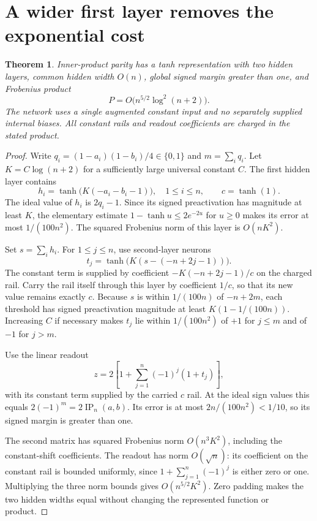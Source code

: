 \documentclass[11pt]{article}
\newtheorem{theorem}{Theorem}[section]
\theoremstyle{remark}\newtheorem{remark}[theorem]{Remark}
\newcommand{\IP}{\operatorname{IP}}
\begin{document}
\section{A wider first layer removes the exponential cost}
\begin{theorem}\label{thm:wide}
Inner-product parity has a tanh representation with two hidden layers,
common hidden width $O(n)$, global signed margin greater than one, and
Frobenius product
\[
 P=O\bigl(n^{5/2}\log^2(n+2)\bigr).
\]
The network uses a single augmented constant input and no separately
supplied internal biases. All constant rails and readout coefficients
are charged in the stated product.
\end{theorem}
\begin{proof}
Write $q_i=(1-a_i)(1-b_i)/4\in\{0,1\}$ and
$m=\sum_iq_i$. Let $K=C\log(n+2)$ for a sufficiently large universal
constant $C$. The first hidden layer contains
\[
 h_i=\tanh\bigl(K(-a_i-b_i-1)\bigr),\quad 1\le i\le n,
 \qquad c=\tanh(1).
\]
The ideal value of $h_i$ is $2q_i-1$. Since its signed preactivation
has magnitude at least $K$, the elementary estimate
$1-\tanh u\le2e^{-2u}$ for $u\ge0$ makes its error at most
$1/(100n^2)$. The squared Frobenius norm of this layer is $O(nK^2)$.

Set $s=\sum_i h_i$. For $1\le j\le n$, use second-layer neurons
\[
 t_j=\tanh\bigl(K(s-(-n+2j-1))\bigr).
\]
The constant term is supplied by coefficient
$-K(-n+2j-1)/c$ on the charged rail. Carry the rail itself through
this layer by coefficient $1/c$, so that its new value remains exactly
$c$. Because $s$ is within $1/(100n)$ of $-n+2m$, each threshold has
signed preactivation magnitude at least $K(1-1/(100n))$. Increasing $C$
if necessary makes $t_j$ lie within $1/(100n^2)$ of $+1$ for $j\le m$
and of $-1$ for $j>m$.

Use the linear readout
\[
 z=2\left[1+\sum_{j=1}^n(-1)^j(1+t_j)\right],
\]
with its constant term supplied by the carried $c$ rail. At the ideal
sign values this equals $2(-1)^m=2\IP_n(a,b)$. Its error is at most
$2n/(100n^2)<1/10$, so its signed margin is greater than one.

The second matrix has squared Frobenius norm $O(n^3K^2)$, including
the constant-shift coefficients. The readout has norm $O(\sqrt n)$:
its coefficient on the constant rail is bounded uniformly, since
$1+\sum_{j=1}^n(-1)^j$ is either zero or one. Multiplying the three
norm bounds gives $O(n^{5/2}K^2)$. Zero padding makes the two hidden
widths equal without changing the represented function or product.
\end{proof}
\end{document}
